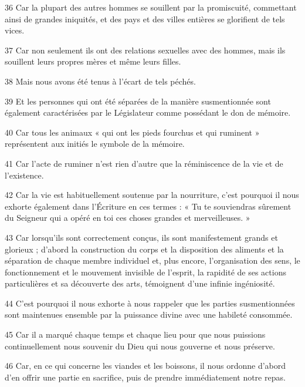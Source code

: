 \par 36 Car la plupart des autres hommes se souillent par la promiscuité, commettant ainsi de grandes iniquités, et des pays et des villes entières se glorifient de tels vices.

\par 37 Car non seulement ils ont des relations sexuelles avec des hommes, mais ils souillent leurs propres mères et même leurs filles.

\par 38 Mais nous avons été tenus à l'écart de tels péchés.

\par 39 Et les personnes qui ont été séparées de la manière susmentionnée sont également caractérisées par le Législateur comme possédant le don de mémoire.

\par 40 Car tous les animaux « qui ont les pieds fourchus et qui ruminent » représentent aux initiés le symbole de la mémoire.

\par 41 Car l'acte de ruminer n'est rien d'autre que la réminiscence de la vie et de l'existence.

\par 42 Car la vie est habituellement soutenue par la nourriture, c'est pourquoi il nous exhorte également dans l'Écriture en ces termes : « Tu te souviendras sûrement du Seigneur qui a opéré en toi ces choses grandes et merveilleuses. »

\par 43 Car lorsqu’ils sont correctement conçus, ils sont manifestement grands et glorieux ; d'abord la construction du corps et la disposition des aliments et la séparation de chaque membre individuel et, plus encore, l'organisation des sens, le fonctionnement et le mouvement invisible de l'esprit, la rapidité de ses actions particulières et sa découverte des arts, témoignent d'une infinie ingéniosité.

\par 44 C'est pourquoi il nous exhorte à nous rappeler que les parties susmentionnées sont maintenues ensemble par la puissance divine avec une habileté consommée.

\par 45 Car il a marqué chaque temps et chaque lieu pour que nous puissions continuellement nous souvenir du Dieu qui nous gouverne et nous préserve.

\par 46 Car, en ce qui concerne les viandes et les boissons, il nous ordonne d'abord d'en offrir une partie en sacrifice, puis de prendre immédiatement notre repas.

